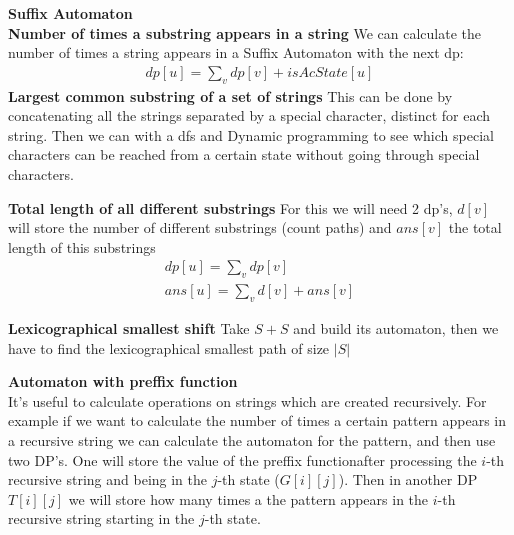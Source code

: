 {\normalsize
  \textbf{Suffix Automaton} \\
  \textbf{Number of times a substring appears in a string} We can calculate
  the number of times a string appears in a Suffix Automaton with the next dp:
  \begin{align*}
    dp[u] = \sum_{v}{dp[v]} + isAcState[u]
  \end{align*}
  \textbf{Largest common substring of a set of strings} This can be done by
  concatenating all the strings separated by a special character, distinct for
  each string. Then we can with a dfs and Dynamic programming to see which
  special characters can be reached from a certain state without going through
  special characters.

  \textbf{Total length of all different substrings} For this we will need 2
  dp's, $d[v]$ will store the number of different substrings (count paths) and
  $ans[v]$ the total length of this substrings
  \begin{align*}
    dp[u] = \sum_{v} dp[v] \\
    ans[u] = \sum_{v} d[v] + ans[v]
  \end{align*}

  \textbf{Lexicographical smallest shift} Take $S + S$ and build its
  automaton, then we have to find the lexicographical smallest path of size
  $|S|$

  \textbf{Automaton with preffix function}\\
  It's useful to calculate operations on strings which are created
  recursively. For example if we want to calculate the number of times a
  certain pattern appears in a recursive string we can calculate the automaton
  for the pattern, and then use two DP's. One will store the value of the
  preffix functionafter processing the $i$-th recursive string and being in
  the $j$-th state ($G[i][j]$). Then in another DP $T[i][j]$ we will store how
  many times a the pattern appears in the $i$-th recursive string starting in
  the $j$-th state.

}
